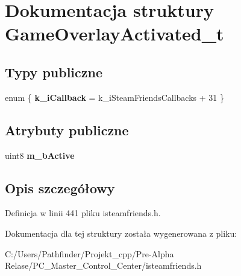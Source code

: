 \hypertarget{struct_game_overlay_activated__t}{}\section{Dokumentacja struktury Game\+Overlay\+Activated\+\_\+t}
\label{struct_game_overlay_activated__t}
\subsection*{Typy publiczne}
\begin{DoxyCompactItemize}
\item 
\mbox{\label{struct_game_overlay_activated__t_a3b2348bf77fa0e8826946e4bb3cca813}} 
enum \{ {\bfseries k\+\_\+i\+Callback} = k\+\_\+i\+Steam\+Friends\+Callbacks + 31
 \}
\end{DoxyCompactItemize}
\subsection*{Atrybuty publiczne}
\begin{DoxyCompactItemize}
\item 
\mbox{\label{struct_game_overlay_activated__t_abff1568c9d4951240009667c4da5d219}} 
uint8 {\bfseries m\+\_\+b\+Active}
\end{DoxyCompactItemize}


\subsection{Opis szczegółowy}


Definicja w linii 441 pliku isteamfriends.\+h.



Dokumentacja dla tej struktury została wygenerowana z pliku\+:\begin{DoxyCompactItemize}
\item 
C\+:/\+Users/\+Pathfinder/\+Projekt\+\_\+cpp/\+Pre-\/\+Alpha Relase/\+P\+C\+\_\+\+Master\+\_\+\+Control\+\_\+\+Center/isteamfriends.\+h\end{DoxyCompactItemize}
